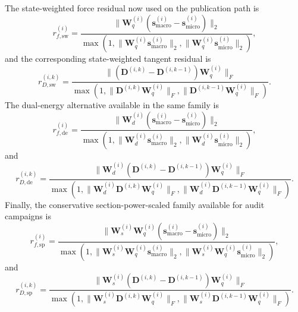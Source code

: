 The state-weighted force residual now used on the publication path is
\begin{equation}
  r_{f,\mathrm{sw}}^{(i)}
  =
  \frac{\lVert \mathbf{W}_q^{(i)}
    (\mathbf{s}_{\text{macro}}^{(i)}-\mathbf{s}_{\text{micro}}^{(i)})
  \rVert_2}
  {\max\!\left(1,
    \lVert \mathbf{W}_q^{(i)}\mathbf{s}_{\text{macro}}^{(i)} \rVert_2,
    \lVert \mathbf{W}_q^{(i)}\mathbf{s}_{\text{micro}}^{(i)} \rVert_2\right)},
  \label{eq:ms-pub-force-residual-state-weighted}
\end{equation}
and the corresponding state-weighted tangent residual is
\begin{equation}
  r_{D,\mathrm{sw}}^{(i,k)}
  =
  \frac{\lVert
    (\mathbf{D}^{(i,k)}-\mathbf{D}^{(i,k-1)})\mathbf{W}_q^{(i)}
  \rVert_F}
  {\max\!\left(1,
    \lVert \mathbf{D}^{(i,k)}\mathbf{W}_q^{(i)} \rVert_F,
    \lVert \mathbf{D}^{(i,k-1)}\mathbf{W}_q^{(i)} \rVert_F\right)}.
  \label{eq:ms-pub-tangent-residual-state-weighted}
\end{equation}
The dual-energy alternative available in the same family is
\begin{equation}
  r_{f,\mathrm{de}}^{(i)}
  =
  \frac{\lVert \mathbf{W}_d^{(i)}
    (\mathbf{s}_{\text{macro}}^{(i)}-\mathbf{s}_{\text{micro}}^{(i)})
  \rVert_2}
  {\max\!\left(1,
    \lVert \mathbf{W}_d^{(i)}\mathbf{s}_{\text{macro}}^{(i)} \rVert_2,
    \lVert \mathbf{W}_d^{(i)}\mathbf{s}_{\text{micro}}^{(i)} \rVert_2\right)},
  \label{eq:ms-pub-force-residual-dual-energy}
\end{equation}
and
\begin{equation}
  r_{D,\mathrm{de}}^{(i,k)}
  =
  \frac{\lVert
    \mathbf{W}_d^{(i)}(\mathbf{D}^{(i,k)}-\mathbf{D}^{(i,k-1)})
    \mathbf{W}_q^{(i)}
  \rVert_F}
  {\max\!\left(1,
    \lVert \mathbf{W}_d^{(i)}\mathbf{D}^{(i,k)}\mathbf{W}_q^{(i)} \rVert_F,
    \lVert \mathbf{W}_d^{(i)}\mathbf{D}^{(i,k-1)}\mathbf{W}_q^{(i)}
    \rVert_F\right)}.
  \label{eq:ms-pub-tangent-residual-dual-energy}
\end{equation}
Finally, the conservative section-power-scaled family available for audit
campaigns is
\begin{equation}
  r_{f,\mathrm{sp}}^{(i)}
  =
  \frac{\lVert \mathbf{W}_s^{(i)}\mathbf{W}_q^{(i)}
    (\mathbf{s}_{\text{macro}}^{(i)}-\mathbf{s}_{\text{micro}}^{(i)})
  \rVert_2}
  {\max\!\left(1,
    \lVert \mathbf{W}_s^{(i)}\mathbf{W}_q^{(i)}
      \mathbf{s}_{\text{macro}}^{(i)} \rVert_2,
    \lVert \mathbf{W}_s^{(i)}\mathbf{W}_q^{(i)}
      \mathbf{s}_{\text{micro}}^{(i)} \rVert_2\right)},
  \label{eq:ms-pub-force-residual-section-power}
\end{equation}
and
\begin{equation}
  r_{D,\mathrm{sp}}^{(i,k)}
  =
  \frac{\lVert
    \mathbf{W}_s^{(i)}(\mathbf{D}^{(i,k)}-\mathbf{D}^{(i,k-1)})
    \mathbf{W}_q^{(i)}
  \rVert_F}
  {\max\!\left(1,
    \lVert \mathbf{W}_s^{(i)}\mathbf{D}^{(i,k)}\mathbf{W}_q^{(i)} \rVert_F,
    \lVert \mathbf{W}_s^{(i)}\mathbf{D}^{(i,k-1)}\mathbf{W}_q^{(i)}
    \rVert_F\right)}.
  \label{eq:ms-pub-tangent-residual-section-power}
\end{equation}

